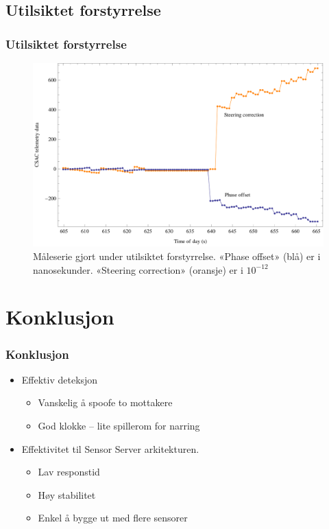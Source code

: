 \documentclass[xcolor=table]{beamer}
\begin{document}
\begin{frame}
\section{Utilsiktet forstyrrelse}
\frametitle{Utilsiktet forstyrrelse}
      \begin{figure}
        \includegraphics[scale=0.70]{thesis/graphics/disturbance57667-csac-telemetry-phase-steer-combined-zoom-in-2-1.png}
        \caption{Måleserie gjort under utilsiktet forstyrrelse. «Phase offset» (blå) er i nanosekunder. «Steering correction» (oransje) er i $10^{-12}$}
      \end{figure}
\end{frame}

\section{Konklusjon}
\begin{frame}
  \frametitle{Konklusjon}
  \begin{itemize}
    \setlength\itemsep{2em}
    \item Effektiv deteksjon 
    \begin{itemize}
      \item Vanskelig å spoofe to mottakere
      \item God klokke -- lite spillerom for narring
    \end{itemize}
    \item Effektivitet til Sensor Server arkitekturen. 
    \begin{itemize}
      \item Lav responstid
      \item Høy stabilitet 
      \item Enkel å bygge ut med flere sensorer
    \end{itemize}
  \end{itemize}
\end{frame}
\end{document}
